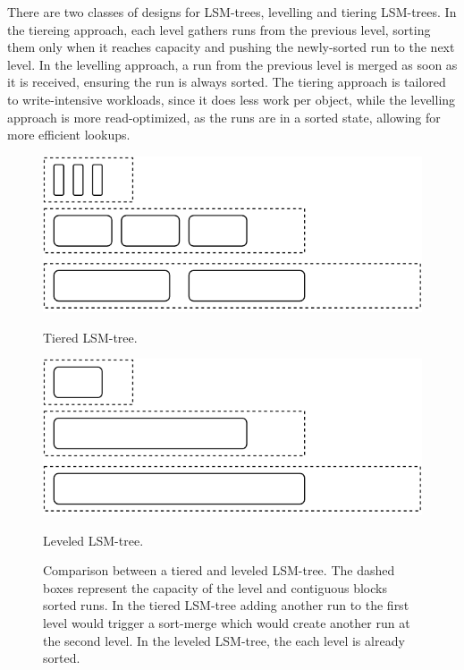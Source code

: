 {There are two classes of designs for \acp{LSM-tree}, levelling
and tiering \acp{LSM-tree}. In the tiereing approach, each level
gathers runs from the previous level, sorting them only when it
reaches capacity and pushing the newly-sorted run to the next
level. In the levelling approach, a run from the previous level
is merged as soon as it is received, ensuring the run is always
sorted. The tiering approach is tailored to write-intensive
workloads, since it does less work per object, while the
levelling approach is more read-optimized, as the runs are in a
sorted state, allowing for more efficient lookups.

\begin{figure}[t]
    \begin{minipage}[t]{0.45\linewidth}
        \centering
        \includegraphics[width=\linewidth]{img/lsm_tiered}
        \caption{Tiered \ac{LSM-tree}.}\label{fig:lsm_tiered}
    \end{minipage}
    \begin{minipage}[t]{0.45\linewidth}
        \centering
        \includegraphics[width=\linewidth]{img/lsm_leveled}
        \caption{Leveled \ac{LSM-tree}.}\label{fig:lsm_leveled}
    \end{minipage}
    \caption{Comparison between a tiered and leveled
    \ac{LSM-tree}. The dashed boxes represent the capacity of the
    level and contiguous blocks sorted runs. In the tiered
    \ac{LSM-tree} adding another run to the first level would
    trigger a sort-merge which would create another run at the
    second level. In the leveled \ac{LSM-tree}, the each level is already sorted. }
\end{figure}

}


